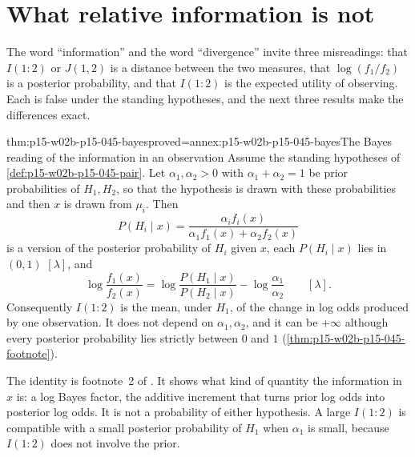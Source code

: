 \section{What relative information is not}
\label{sec:p15-w02b-p15-045-distinctions}

The word ``information'' and the word ``divergence'' invite three
misreadings: that \(I(1:2)\) or \(J(1,2)\) is a distance between the
two measures, that \(\log(f_1/f_2)\) is a posterior probability, and
that \(I(1:2)\) is the expected utility of observing. Each is false
under the standing hypotheses, and the next three results make the
differences exact.

\begin{hbtheorem}{thm:p15-w02b-p15-045-bayes}{proved=annex:p15-w02b-p15-045-bayes}{The Bayes reading of the information in an observation}
Assume the standing hypotheses of \cref{def:p15-w02b-p15-045-pair}.
Let \(\alpha_1,\alpha_2>0\) with \(\alpha_1+\alpha_2=1\) be prior
probabilities of \(H_1,H_2\), so that the hypothesis is drawn with these
probabilities and then \(x\) is drawn from \(\mu_i\). Then
\[
  P(H_i\mid x)=\frac{\alpha_if_i(x)}{\alpha_1f_1(x)+\alpha_2f_2(x)}
\]
is a version of the posterior probability of \(H_i\) given \(x\), each
\(P(H_i\mid x)\) lies in \((0,1)\) \([\lambda]\), and
\[
  \log\frac{f_1(x)}{f_2(x)}
   =\log\frac{P(H_1\mid x)}{P(H_2\mid x)}-\log\frac{\alpha_1}{\alpha_2}
   \qquad[\lambda].
\]
Consequently \(I(1:2)\) is the mean, under \(H_1\), of the change in log
odds produced by one observation. It does not depend on
\(\alpha_1,\alpha_2\), and it can be \(+\infty\) although every
posterior probability lies strictly between \(0\) and \(1\)
(\cref{thm:p15-w02b-p15-045-footnote}).
\end{hbtheorem}

The identity is footnote~2 of
\cite[p.~80]{KullbackLeibler1951Information}. It shows what kind of
quantity the information in \(x\) is: a log Bayes factor, the additive
increment that turns prior log odds into posterior log odds. It is not a
probability of either hypothesis. A large \(I(1:2)\) is compatible with
a small posterior probability of \(H_1\) when \(\alpha_1\) is small,
because \(I(1:2)\) does not involve the prior.

